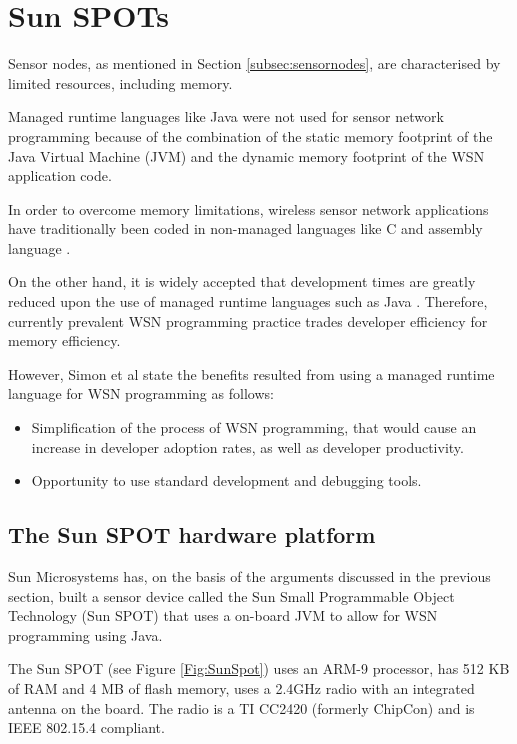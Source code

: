 \section {Sun SPOTs} \label{sec:sunspots}

Sensor nodes, as mentioned in Section \ref{subsec:sensornodes}, are
characterised by limited resources, including memory.
 
Managed runtime languages like Java were not used for sensor network programming
because of the combination of the static memory footprint of the Java Virtual
Machine (JVM) and the dynamic memory footprint of the WSN application code.

In order to overcome
memory limitations, wireless sensor network applications have traditionally been
 coded in non-managed languages like C and assembly language
 \cite{simon_squawk:2006}. 
 
 On the other hand, it is widely accepted that development times are greatly reduced
upon the use of managed runtime languages such as Java
\cite{simon_squawk:2006}. Therefore, currently prevalent WSN programming practice
trades developer efficiency for memory efficiency. 

However, Simon et al \cite{simon_squawk:2006} state the benefits resulted from
using a managed runtime language for WSN programming as follows:

\begin{itemize}
  \item Simplification of the process of WSN programming, that would cause an
  increase in developer adoption rates, as well as developer productivity.
  \item Opportunity to use standard development and debugging tools.
\end{itemize}
 
\subsection{The Sun SPOT hardware platform }
Sun Microsystems has, on the basis of the arguments discussed in the previous
section, built a sensor device
called the Sun Small Programmable Object Technology (Sun SPOT) that uses a
on-board JVM to allow for WSN programming using Java.

The Sun SPOT (see Figure \ref{Fig:SunSpot}) uses an ARM-9 processor, has 512 KB of RAM
and 4 MB of flash memory, uses a 2.4GHz radio with an integrated antenna on the board. The radio
is a TI CC2420 (formerly ChipCon) and is IEEE 802.15.4 compliant.

